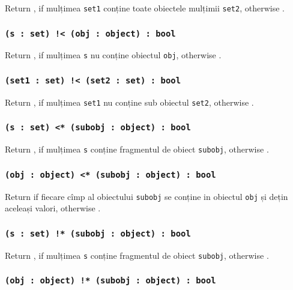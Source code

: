 Return \true, if mulțimea \texttt{set1} conține toate obiectele mulțimii \texttt{set2}, otherwise \false.

\subsubsection{\texttt{(s : set) !< (obj : object) : bool}}

Return \true{}, if mulțimea \texttt{s} nu conține obiectul \texttt{obj}, otherwise \false{}.

\subsubsection{\texttt{(set1 : set) !< (set2 : set) : bool}}

Return \true, if mulțimea \texttt{set1} nu conține sub obiectul \texttt{set2}, otherwise \false.

\subsubsection{\texttt{(s : set) <* (subobj : object) : bool}}

Return \true{}, if mulțimea \texttt{s} conține fragmentul de obiect \texttt{subobj}, otherwise \false{}.

\subsubsection{\texttt{(obj : object) <* (subobj : object) : bool}}

Return \true{} if fiecare cîmp al obiectului \texttt{subobj} se conține in obiectul \texttt{obj} și dețin aceleași valori, otherwise \false{}.

\subsubsection{\texttt{(s : set) !* (subobj : object) : bool}}

Return \false{}, if mulțimea \texttt{s} conține fragmentul de obiect \texttt{subobj}, otherwise \true{}.

\subsubsection{\texttt{(obj : object) !* (subobj : object) : bool}}

